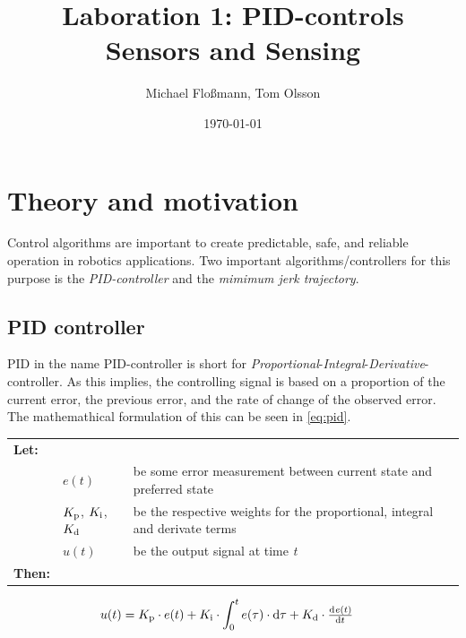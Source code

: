 \documentclass[11pt]{article}
\title{Laboration 1: PID-controls\\ {\small Sensors and Sensing}}
\author{Michael Flo{\ss}mann, Tom Olsson}
\date{\today}
\begin{document}
\maketitle %
\listoffigures %
\lstlistoflistings %
\lstset{ matchrangestart=t} %
\section{Theory and motivation}
Control algorithms are important to create predictable, safe, and reliable operation in robotics applications. Two important algorithms/controllers for this purpose is the \emph{PID-controller} and the \emph{mimimum jerk trajectory}. 

\subsection{PID controller}
PID in the name PID-controller is short for \emph{Proportional}-\emph{Integral}-\emph{Derivative}-controller. As this implies, the controlling signal is based on a proportion of the current error, the previous error, and the rate of change of the observed error. The mathemathical formulation of this can be seen in \vref{eq:pid}.\par \vspace{10pt}
{\footnotesize
  \begin{tabular}{l l l}
    \textbf{Let:} \\
 &$e(t)$ &be some error measurement between current state and preferred state\\
 &$K_\textup{p}$, $K_\textup{i}$, $K_\textup{d}$ &be the respective weights for the proportional, integral and derivate terms \\
 &$u(t)$ &be the output signal at time \emph{t} \\
    \textbf{Then:}
  \end{tabular}
  \begin{align}
    u(t) &= \di{K}{p}\cdot e(t) + \di{K}{i} \cdot\int_{0}^{t}e(\tau)\cdot \dif\tau + \di{K}{d} \cdot \od{e(t)}{t}\label{eq:pid}
  \end{align}}
\par
\end{document}
